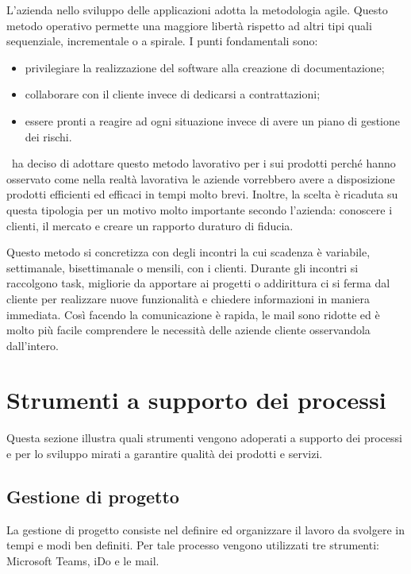 L'azienda nello sviluppo delle applicazioni adotta la metodologia agile. Questo metodo operativo permette una maggiore libertà rispetto ad altri tipi quali sequenziale, incrementale o a spirale. I punti fondamentali sono:
\begin{itemize}
	\item privilegiare la realizzazione del software alla creazione di documentazione;
	\item collaborare con il cliente invece di dedicarsi a contrattazioni;
	\item essere pronti a reagire ad ogni situazione invece di avere un piano di gestione dei rischi.
\end{itemize}
\azienda\ ha deciso di adottare questo metodo lavorativo per i sui prodotti perché hanno osservato come nella realtà lavorativa le aziende vorrebbero avere a disposizione prodotti efficienti ed efficaci in tempi molto brevi. 
Inoltre, la scelta è ricaduta su questa tipologia per un motivo molto importante secondo l'azienda: conoscere i clienti, il mercato e creare un rapporto duraturo di fiducia. 

Questo metodo si concretizza con degli incontri la cui scadenza è variabile, settimanale, bisettimanale o mensili, con i clienti. Durante gli incontri si raccolgono task, migliorie da apportare ai progetti o addirittura ci si ferma dal cliente per realizzare nuove funzionalità e chiedere informazioni in maniera immediata. Così facendo la comunicazione è rapida, le mail sono ridotte ed è molto più facile comprendere le necessità delle aziende cliente osservandola dall'intero.

\newpage

\section{Strumenti a supporto dei processi}
\label{cap1:Strumenti a supporto dei processi}

Questa sezione illustra quali strumenti vengono adoperati a supporto dei processi e per lo sviluppo mirati a garantire qualità dei prodotti e servizi.

\subsection{Gestione di progetto}
\label{cap1:Gestione di progetto}

La gestione di progetto consiste nel definire ed organizzare il lavoro da svolgere in tempi e modi ben definiti. Per tale processo vengono utilizzati tre strumenti: Microsoft Teams, iDo e le mail.

